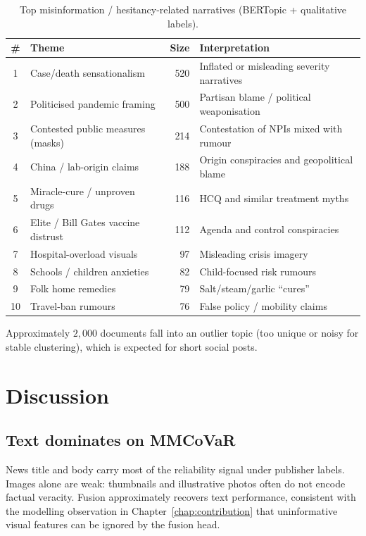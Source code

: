 \documentclass[12pt, a4paper]{report}
\begin{document}
\begin{table}[htbp]
\centering
\caption{Top misinformation / hesitancy-related narratives (BERTopic + qualitative labels).}
\label{tab:taxonomy}
\small
\begin{tabular}{clrp{5.0cm}}
\hline
\# & Theme & Size & Interpretation \\
\hline
1 & Case/death sensationalism & 520 & Inflated or misleading severity narratives \\
2 & Politicised pandemic framing & 500 & Partisan blame / political weaponisation \\
3 & Contested public measures (masks) & 214 & Contestation of NPIs mixed with rumour \\
4 & China / lab-origin claims & 188 & Origin conspiracies and geopolitical blame \\
5 & Miracle-cure / unproven drugs & 116 & HCQ and similar treatment myths \\
6 & Elite / Bill Gates vaccine distrust & 112 & Agenda and control conspiracies \\
7 & Hospital-overload visuals & 97 & Misleading crisis imagery \\
8 & Schools / children anxieties & 82 & Child-focused risk rumours \\
9 & Folk home remedies & 79 & Salt/steam/garlic ``cures'' \\
10 & Travel-ban rumours & 76 & False policy / mobility claims \\
\hline
\end{tabular}
\end{table}

Approximately $2{,}000$ documents fall into an outlier topic (too unique or noisy for stable clustering), which is expected for short social posts.

\section{Discussion}
\label{sec:discussion}

\subsection{Text dominates on MMCoVaR}

News title and body carry most of the reliability signal under publisher labels.
Images alone are weak: thumbnails and illustrative photos often do not encode factual veracity.
Fusion approximately recovers text performance, consistent with the modelling observation in Chapter~\ref{chap:contribution} that uninformative visual features can be ignored by the fusion head.
\end{document}
